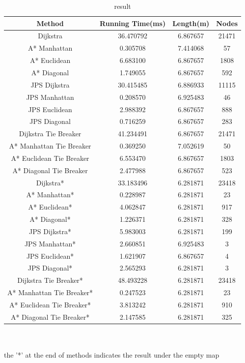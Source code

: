 \documentclass[conference]{IEEEtran}
\begin{document}
\begin{table}[htbp]
	\caption{result}
	\centering 
	\begin{tabular}{cccc}
		\toprule
		Method & Running Time(ms) & Length(m) & Nodes \\
		\midrule
		Dijkstra &  36.470792 & 6.867657  & 21471  \\
		A* Manhattan &  0.305708 & 7.414068  & 57  \\
		A* Euclidean & 6.683100 & 6.867657  & 1808  \\
		A* Diagonal & 1.749055 & 6.867657  & 592   \\
		JPS Dijkstra &  30.415485 & 6.886933  & 11115  \\
		JPS Manhattan &  0.208570 & 6.925483  & 46  \\
		JPS Euclidean & 2.988392 & 6.867657  & 888  \\
		JPS Diagonal & 0.716259 & 6.867657  & 283   \\
		Dijkstra Tie Breaker & 41.234491 & 6.867657  & 21471   \\
		A* Manhattan Tie Breaker & 0.369250 & 7.052619  & 50 \\
		A* Euclidean Tie Breaker & 6.553470 & 6.867657  & 1803 \\
		A* Diagonal Tie Breaker & 2.477988 & 6.867657  & 523 \\
		\hline
		Dijkstra* &  33.183496 & 6.281871  & 23418  \\
		A* Manhattan* &  0.228987 & 6.281871  & 23  \\
		A* Euclidean* & 4.062847 & 6.281871  & 917  \\
		A* Diagonal* & 1.226371 & 6.281871  & 328   \\
		JPS Dijkstra* & 5.983003 & 6.281871  & 199   \\
		JPS Manhattan* &  2.660851 & 6.925483  & 3  \\
		JPS Euclidean* & 1.621907 & 6.867657  & 4  \\
		JPS Diagonal* & 2.565293 & 6.281871  & 3   \\
		Dijkstra Tie Breaker* & 48.493228 & 6.281871  & 23418   \\
		A* Manhattan Tie Breaker* & 0.247523 & 6.281871  & 23 \\
		A* Euclidean Tie Breaker* & 3.813242 & 6.281871  & 910 \\
		A* Diagonal Tie Breaker* & 2.147585 & 6.281871  & 325 \\
		\bottomrule
	\end{tabular}
\\ \ 
\\ the '*' at the end of methods indicates the result under the empty map

	\label{tbl:table1}
\end{table}
\end{document}
